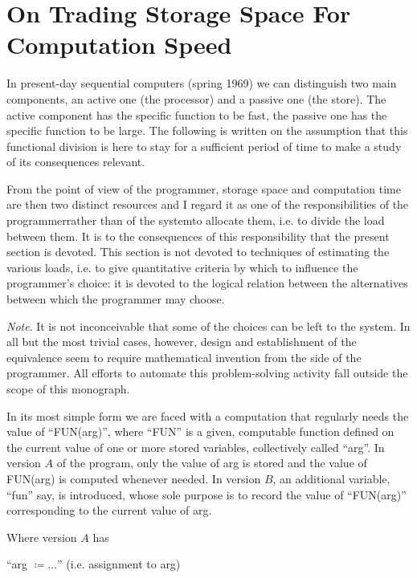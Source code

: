 \documentclass[twoside,11pt]{book}
\begin{document}
\section[On trading storage space for computation speed]{On Trading Storage Space For Computation Speed}
\label{sec:trading-storage-for-computation-speed}

In present-day sequential computers (spring 1969) we can distinguish two main components, an active one (the processor) and a passive one (the store). The active component has the specific function to be fast, the passive one has the specific function to be large. The following is written on the assumption that this functional division is here to stay for a sufficient period of time to make a study of its consequences relevant.

From the point of view of the programmer, storage space and computation time are then two distinct resources and I regard it as one of the responsibilities of the programmer\textemdash{}rather than of the system\textemdash{}to allocate them, i.e. to divide the load between them. It is to the consequences of this responsibility that the present section is devoted. This section is not devoted to techniques of estimating the various loads, i.e. to give quantitative criteria by which to influence the programmer's choice: it is devoted to the logical relation between the alternatives between which the programmer may choose.

\noindent
\textit{Note}. It is not inconceivable that some of the choices can be left to the system. In all but the most trivial cases, however, design and establishment of the equivalence seem to require mathematical invention from the side of the programmer. All efforts to automate this problem-solving activity fall outside the scope of this monograph.

In its most simple form we are faced with a computation that regularly needs the value of ``FUN(arg)'', where ``FUN'' is a given, computable function defined on the current value of one or more stored variables, collectively called ``arg''. In version $A$ of the program, only the value of arg is stored and the value of FUN(arg) is computed whenever needed. In version $B$, an additional variable, ``fun'' say, is introduced, whose sole purpose is to record the value of ``FUN(arg)'' corresponding to the current value of arg.

Where version $A$ has
\medskip

{
	\setlength{\parindent}{8em}
	\hspace{-.4em}``arg $\coloneq \dots$'' (i.e. assignment to arg)
	
}
\medskip
\end{document}
